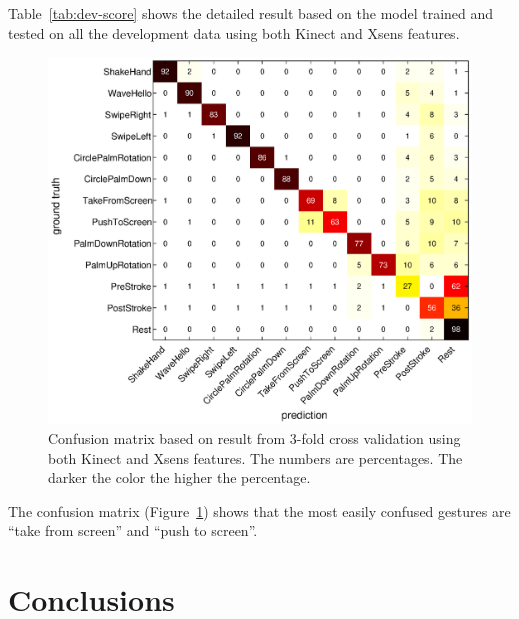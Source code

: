 \documentclass{acm_proc_article-sp}
\begin{document}
Table~\ref{tab:dev-score} shows the detailed result based on the model trained and tested
 on all the development data using both Kinect and Xsens features.

\begin{figure}[tb]
\centering
\includegraphics[trim={6cm 3.5cm 10cm 1.5cm}, clip, width=1\columnwidth]{fig/confusion-matrix.eps}
\caption{Confusion matrix based on result from 3-fold cross validation using both Kinect and Xsens
features. The numbers are percentages. The darker the color the higher the percentage.}
\label{fig:confusion}
\end{figure}

The confusion matrix (Figure~\ref{fig:confusion}) shows that the most easily confused gestures
are ``take from screen'' and ``push to screen''.
\section{Conclusions}
 


%

\balancecolumns %
\end{document}
